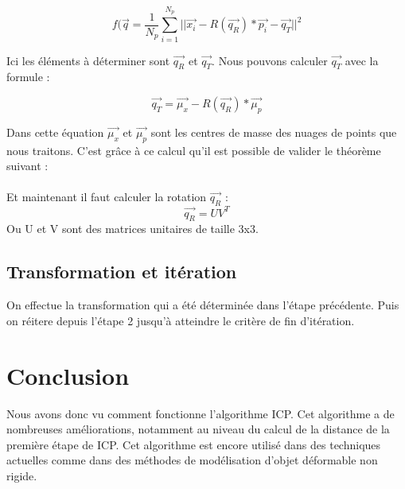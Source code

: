 \documentclass[a4paper,10pt]{article}
\begin{document}
\begin{equation} 
 f(\vec{q} = \frac{1}{N_p}\sum_{i=1}^{N_p}||\vec{x_i} - R(\vec{q_R}) * \vec{p_i} - \vec{q_T}||^2
\end{equation}

Ici les éléments à déterminer sont $\vec{q_R}$ et $\vec{q_T}$. Nous pouvons calculer $\vec{q_T}$ avec la formule :

\begin{equation} 
 \vec{q_T} = \vec{\mu_x} - R(\vec{q_R})*\vec{\mu_p}
\end{equation}

Dans cette équation $\vec{\mu_x}$ et $\vec{\mu_p}$ sont les centres de masse des
nuages de points que nous traitons. C'est grâce à ce calcul qu'il est possible de
valider le théorème suivant : \\

\\

Et maintenant il faut calculer la rotation $\vec{q_R}$ :
\begin{equation} 
 \vec{q_R} = UV^T
\end{equation} 
Ou U et V sont des matrices unitaires de taille 3x3.
\subsection{Transformation et itération}
 On effectue la transformation qui a été déterminée dans l'étape précédente.
 Puis on réitere depuis l'étape 2 jusqu'à atteindre le critère de fin d'itération.

\section{Conclusion}
Nous avons donc vu comment fonctionne l'algorithme ICP. Cet algorithme a de nombreuses améliorations, notamment au niveau du calcul de la distance de la première étape de ICP.
Cet algorithme est encore utilisé dans des techniques actuelles comme dans des méthodes
de modélisation d'objet déformable non rigide.
\end{document}

